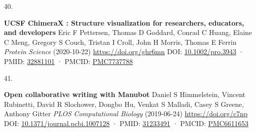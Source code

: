 \documentclass[
]{article}
\newlength{\cslhangindent}
\newlength{\csllabelwidth}
\newlength{\cslentryspacingunit} %
\newenvironment{CSLReferences}[2] %
 {%
  \setlength{\parindent}{0pt}
  \ifodd #1
  \let\oldpar\par
  \def\par{\hangindent=\cslhangindent\oldpar}
  \fi
  \setlength{\parskip}{#2\cslentryspacingunit}
 }%
 {}
\newcommand{\CSLBlock}[1]{#1\hfill\break}
\newcommand{\CSLLeftMargin}[1]{\parbox[t]{\csllabelwidth}{#1}}
\newcommand{\CSLRightInline}[1]{\parbox[t]{\linewidth - \csllabelwidth}{#1}\break}
\providecommand{\DIFaddbegin}{} %
\providecommand{\DIFaddend}{} %
\providecommand{\DIFdelbegin}{} %
\providecommand{\DIFdelend}{} %
\newcommand{\DIFscaledelfig}{0.5}
\newlength{\DIFdelgraphicswidth} %
\newlength{\DIFdelgraphicsheight} %
\newcommand{\DIFaddincludegraphics}[2][]{{\color{blue}\fbox{\DIFOincludegraphics[#1]{#2}}}} %
\newcommand{\DIFdelincludegraphics}[2][]{%
\sbox{\DIFdelgraphicsbox}{\DIFOincludegraphics[#1]{#2}}%
\settoboxwidth{\DIFdelgraphicswidth}{\DIFdelgraphicsbox} %
\settoboxtotalheight{\DIFdelgraphicsheight}{\DIFdelgraphicsbox} %
\scalebox{\DIFscaledelfig}{%
\parbox[b]{\DIFdelgraphicswidth}{\usebox{\DIFdelgraphicsbox}\\[-\baselineskip] \rule{\DIFdelgraphicswidth}{0em}}\llap{\resizebox{\DIFdelgraphicswidth}{\DIFdelgraphicsheight}{%
\setlength{\unitlength}{\DIFdelgraphicswidth}%
\begin{picture}(1,1)%
\thicklines\linethickness{2pt} %
{\color[rgb]{1,0,0}\put(0,0){\framebox(1,1){}}}%
{\color[rgb]{1,0,0}\put(0,0){\line( 1,1){1}}}%
{\color[rgb]{1,0,0}\put(0,1){\line(1,-1){1}}}%
\end{picture}%
}\hspace*{3pt}}} %
} %
\DeclareRobustCommand{\DIFaddbegin}{\DIFOaddbegin \let\includegraphics\DIFaddincludegraphics} %
\DeclareRobustCommand{\DIFaddend}{\DIFOaddend \let\includegraphics\DIFOincludegraphics} %
\DeclareRobustCommand{\DIFdelbegin}{\DIFOdelbegin \let\includegraphics\DIFdelincludegraphics} %
\DeclareRobustCommand{\DIFdelend}{\DIFOaddend \let\includegraphics\DIFOincludegraphics} %
\begin{document}
\begin{CSLReferences}{0}{0}
\leavevmode{}%
\DIFdelbegin %
\DIFdelend \DIFaddbegin \CSLLeftMargin{40. }\DIFaddend %
\DIFdelbegin %
\DIFdelend \DIFaddbegin \CSLRightInline{\textbf{UCSF ChimeraX
: Structure visualization for researchers, educators, and developers}
\CSLBlock{Eric F Pettersen, Thomas D Goddard, Conrad C Huang, Elaine C Meng, Gregory S Couch, Tristan I Croll, John H Morris, Thomas E Ferrin} \emph{Protein Science} (2020-10-22) \url{https://doi.org/ghr6mn}
\CSLBlock{DOI: \href{https://doi.org/10.1002/pro.3943}{10.1002/pro.3943} · PMID: \href{https://www.ncbi.nlm.nih.gov/pubmed/32881101}{32881101} · PMCID: \href{https://www.ncbi.nlm.nih.gov/pmc/articles/PMC7737788}{PMC7737788}}}
\DIFaddend 

\leavevmode{}%
\DIFdelbegin %
\DIFdelend \DIFaddbegin \CSLLeftMargin{41. }\DIFaddend %
\CSLRightInline{\textbf{Open collaborative writing with Manubot}
\CSLBlock{Daniel S Himmelstein, Vincent Rubinetti, David R Slochower, Dongbo Hu, Venkat S Malladi, Casey S Greene, Anthony Gitter} \emph{PLOS Computational Biology} (2019-06-24) \url{https://doi.org/c7np}
\CSLBlock{DOI: \href{https://doi.org/10.1371/journal.pcbi.1007128}{10.1371/journal.pcbi.1007128} · PMID: \href{https://www.ncbi.nlm.nih.gov/pubmed/31233491}{31233491} · PMCID: \href{https://www.ncbi.nlm.nih.gov/pmc/articles/PMC6611653}{PMC6611653}}}

\end{CSLReferences}
\end{document}
